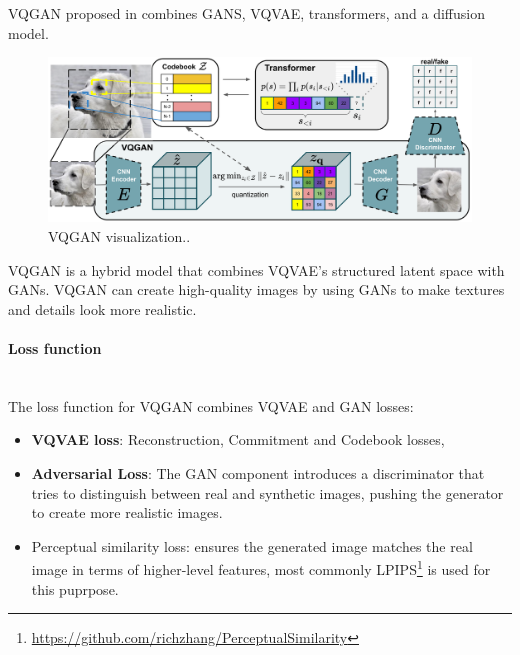 VQGAN proposed in \cite{Esser_2021_CVPR} combines GANS, VQVAE, transformers, and a diffusion model.


\begin{figure}[H]
    \centering
    \includegraphics[width=0.9\linewidth]{concept_engineering/vqgan/vqgan.png}
    \caption{VQGAN visualization.\cite{Esser_2021_CVPR}. }
    \label{fig:vqgan-diagram}
\end{figure}

VQGAN is a hybrid model that combines VQVAE's structured latent space with GANs. VQGAN can create high-quality images by using GANs to make textures and details look more realistic.

\paragraph{Loss function}\mbox{}\\

The loss function for VQGAN combines VQVAE and GAN losses:

\begin{itemize}
    \item \textbf{VQVAE loss}: Reconstruction, Commitment and Codebook losses,
    \item \textbf{Adversarial Loss}: The GAN component introduces a discriminator that tries to distinguish between real and synthetic images, pushing the generator to create more realistic images.
    \item Perceptual similarity loss: ensures the generated image matches the real image in terms of higher-level features, most commonly LPIPS\footnote{\url{https://github.com/richzhang/PerceptualSimilarity}} is used for this puprpose.
\end{itemize}


